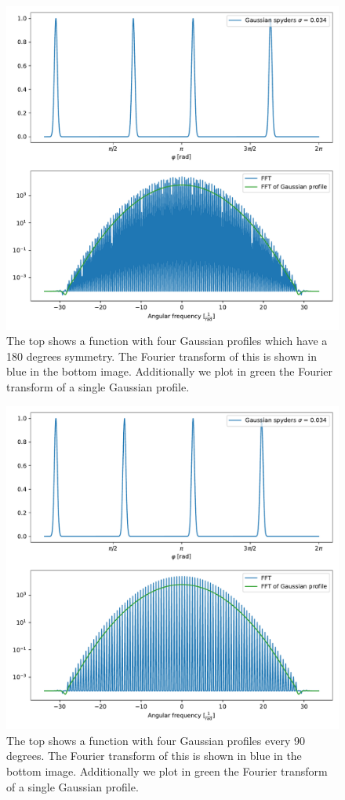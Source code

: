 \begin{figure}[H]
	\centering
		\includegraphics[width=1.0\textwidth]{pics/Gaussian_fourspyders.pdf}
		\caption{The top shows a function with four Gaussian profiles which have a 180 degrees symmetry. The Fourier transform of this is shown in blue in the bottom image. Additionally we plot in green the Fourier transform of a single Gaussian profile.}
		\label{fig:Gauss_fourspyders}
\end{figure} 
\begin{figure}[H]
	\centering
		\includegraphics[width=1.0\textwidth]{pics/Gaussian_fourspyders90.pdf}
		\caption{The top shows a function with four Gaussian profiles every 90 degrees. The Fourier transform of this is shown in blue in the bottom image. Additionally we plot in green the Fourier transform of a single Gaussian profile.}
		\label{fig:Gauss_fourspyders90}
\end{figure} 
